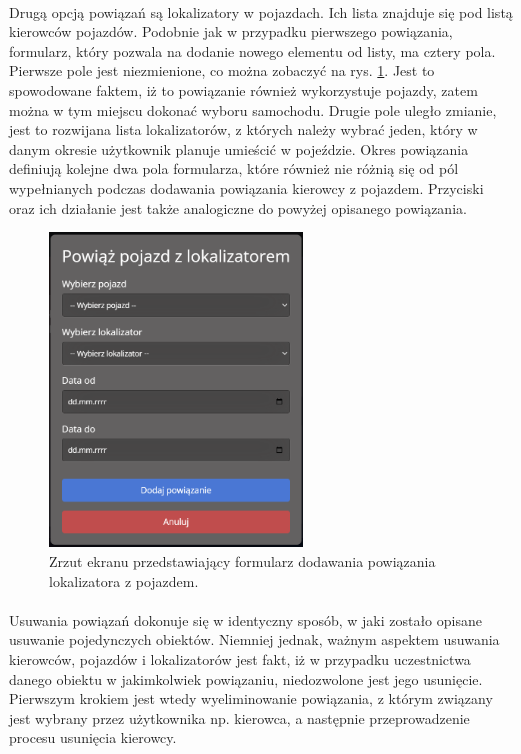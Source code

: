 \paragraph{}
Drugą opcją powiązań są lokalizatory w pojazdach. Ich lista znajduje się pod listą kierowców pojazdów. Podobnie jak w przypadku pierwszego powiązania, formularz, który pozwala na dodanie nowego elementu od listy, ma cztery pola. Pierwsze pole jest niezmienione, co można zobaczyć na rys. \ref{fig:add_tracker_vehicle}. Jest to spowodowane faktem, iż to powiązanie również wykorzystuje pojazdy, zatem można w tym miejscu dokonać wyboru samochodu. Drugie pole uległo zmianie, jest to rozwijana lista lokalizatorów, z których należy wybrać jeden, który w danym okresie użytkownik planuje umieścić w pojeździe. Okres powiązania definiują kolejne dwa pola formularza, które również nie różnią się od pól wypełnianych podczas dodawania powiązania kierowcy z pojazdem. Przyciski oraz ich działanie jest także analogiczne do powyżej opisanego powiązania.

\begin{figure}
	\centering
	\includegraphics[width=0.6\textwidth]{./graf/add_tracker_vehicle.png}
	\caption{Zrzut ekranu przedstawiający formularz dodawania powiązania lokalizatora z pojazdem.}
	\label{fig:add_tracker_vehicle}
\end{figure}

\paragraph{}
Usuwania powiązań dokonuje się w identyczny sposób, w jaki zostało opisane usuwanie pojedynczych obiektów. Niemniej jednak, ważnym aspektem usuwania kierowców, pojazdów i lokalizatorów jest fakt, iż w przypadku uczestnictwa danego obiektu w jakimkolwiek powiązaniu, niedozwolone jest jego usunięcie. Pierwszym krokiem jest wtedy wyeliminowanie powiązania, z którym związany jest wybrany przez użytkownika np. kierowca, a następnie przeprowadzenie procesu usunięcia kierowcy.

